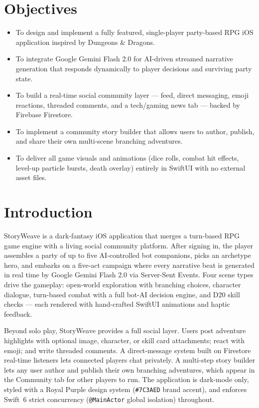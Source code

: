 \documentclass[12pt,a4paper]{article}
\begin{document}
\section{Objectives}

\begin{itemize}[leftmargin=1.5em]
  \item To design and implement a fully featured, single-player party-based RPG iOS application inspired by Dungeons \& Dragons.
  \item To integrate Google Gemini Flash 2.0 for AI-driven streamed narrative generation that responds dynamically to player decisions and surviving party state.
  \item To build a real-time social community layer — feed, direct messaging, emoji reactions, threaded comments, and a tech/gaming news tab — backed by Firebase Firestore.
  \item To implement a community story builder that allows users to author, publish, and share their own multi-scene branching adventures.
  \item To deliver all game visuals and animations (dice rolls, combat hit effects, level-up particle bursts, death overlay) entirely in SwiftUI with no external asset files.
\end{itemize}

\section{Introduction}

StoryWeave is a dark-fantasy iOS application that merges a turn-based RPG game engine with a living social community platform. After signing in, the player assembles a party of up to five AI-controlled bot companions, picks an archetype hero, and embarks on a five-act campaign where every narrative beat is generated in real time by Google Gemini Flash 2.0 via Server-Sent Events. Four scene types drive the gameplay: open-world exploration with branching choices, character dialogue, turn-based combat with a full bot-AI decision engine, and D20 skill checks — each rendered with hand-crafted SwiftUI animations and haptic feedback.

Beyond solo play, StoryWeave provides a full social layer. Users post adventure highlights with optional image, character, or skill card attachments; react with emoji; and write threaded comments. A direct-message system built on Firestore real-time listeners lets connected players chat privately. A multi-step story builder lets any user author and publish their own branching adventures, which appear in the Community tab for other players to run. The application is dark-mode only, styled with a Royal Purple design system (\texttt{\#7C3AED} brand accent), and enforces Swift~6 strict concurrency (\texttt{@MainActor} global isolation) throughout.
\end{document}
